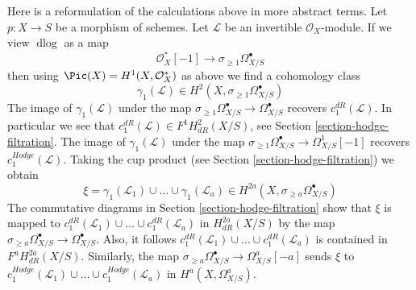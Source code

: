 \begin{remark}
\label{remark-truncations}
Here is a reformulation of the calculations above in more abstract terms.
Let $p : X \to S$ be a morphism of schemes. Let $\mathcal{L}$ be an
invertible $\mathcal{O}_X$-module. If we view $\text{d}\log$ as a map
$$
\mathcal{O}_X^*[-1] \to \sigma_{\geq 1}\Omega^\bullet_{X/S}
$$
then using $\Pic(X) = H^1(X, \mathcal{O}_X^*)$ as above we find a
cohomology class
$$
\gamma_1(\mathcal{L}) \in H^2(X, \sigma_{\geq 1}\Omega^\bullet_{X/S})
$$
The image of $\gamma_1(\mathcal{L})$ under the map
$\sigma_{\geq 1}\Omega^\bullet_{X/S} \to \Omega^\bullet_{X/S}$
recovers $c_1^{dR}(\mathcal{L})$. In particular we see that
$c_1^{dR}(\mathcal{L}) \in F^1H^2_{dR}(X/S)$, see
Section \ref{section-hodge-filtration}. The image of $\gamma_1(\mathcal{L})$
under the map $\sigma_{\geq 1}\Omega^\bullet_{X/S} \to \Omega^1_{X/S}[-1]$
recovers $c_1^{Hodge}(\mathcal{L})$. Taking the cup product
(see Section \ref{section-hodge-filtration}) we obtain
$$
\xi = \gamma_1(\mathcal{L}_1) \cup \ldots \cup \gamma_1(\mathcal{L}_a) \in
H^{2a}(X, \sigma_{\geq a}\Omega^\bullet_{X/S})
$$
The commutative diagrams in Section \ref{section-hodge-filtration}
show that $\xi$ is mapped to
$c_1^{dR}(\mathcal{L}_1) \cup \ldots \cup c_1^{dR}(\mathcal{L}_a)$
in $H^{2a}_{dR}(X/S)$ by the map
$\sigma_{\geq a}\Omega^\bullet_{X/S} \to \Omega^\bullet_{X/S}$.
Also, it follows
$c_1^{dR}(\mathcal{L}_1) \cup \ldots \cup c_1^{dR}(\mathcal{L}_a)$
is contained in $F^a H^{2a}_{dR}(X/S)$. Similarly, the map
$\sigma_{\geq a}\Omega^\bullet_{X/S} \to \Omega^a_{X/S}[-a]$
sends $\xi$ to
$c_1^{Hodge}(\mathcal{L}_1) \cup \ldots \cup c_1^{Hodge}(\mathcal{L}_a)$
in $H^a(X, \Omega^a_{X/S})$.
\end{remark}

